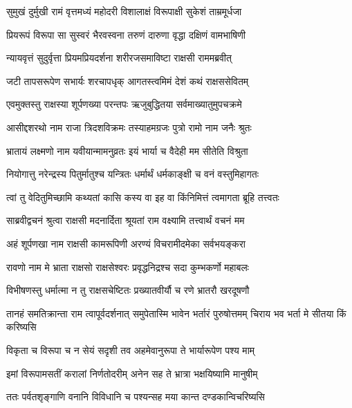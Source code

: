\twolineshloka
{सुमुखं दुर्मुखी रामं वृत्तमध्यं महोदरी}
{विशालाक्षं विरूपाक्षी सुकेशं ताम्रमूर्धजा} %

\twolineshloka
{प्रियरूपं विरूपा सा सुस्वरं भैरवस्वना}
{तरुणं दारुणा वृद्धा दक्षिणं वामभाषिणी} %

\twolineshloka
{न्यायवृत्तं सुदुर्वृत्ता प्रियमप्रियदर्शना}
{शरीरजसमाविष्टा राक्षसी राममब्रवीत्} %

\twolineshloka
{जटी तापसरूपेण सभार्यः शरचापधृक्}
{आगतस्त्वमिमं देशं कथं राक्षससेवितम्} %

\twolineshloka
{एवमुक्तस्तु राक्षस्या शूर्पणख्या परन्तपः}
{ऋजुबुद्धितया सर्वमाख्यातुमुपचक्रमे} %

\twolineshloka
{आसीद्दशरथो नाम राजा त्रिदशविक्रमः}
{तस्याहमग्रजः पुत्रो रामो नाम जनैः श्रुतः} %

\twolineshloka
{भ्रातायं लक्ष्मणो नाम यवीयान्मामनुव्रतः}
{इयं भार्या च वैदेही मम सीतेति विश्रुता} %

\twolineshloka
{नियोगात्तु नरेन्द्रस्य पितुर्मातुश्च यन्त्रितः}
{धर्मार्थं धर्मकाङ्क्षी च वनं वस्तुमिहागतः} %

\twolineshloka
{त्वां तु वेदितुमिच्छामि कथ्यतां कासि कस्य वा}
{इह वा किंनिमित्तं त्वमागता ब्रूहि तत्त्वतः} %

\twolineshloka
{साब्रवीद्वचनं श्रुत्वा राक्षसी मदनार्दिता}
{श्रूयतां राम वक्ष्यामि तत्त्वार्थं वचनं मम} %

\twolineshloka
{अहं शूर्पणखा नाम राक्षसी कामरूपिणी}
{अरण्यं विचरामीदमेका सर्वभयङ्करा} %

\twolineshloka
{रावणो नाम मे भ्राता राक्षसो राक्षसेश्वरः}
{प्रवृद्धनिद्रश्च सदा कुम्भकर्णो महाबलः} %

\twolineshloka
{विभीषणस्तु धर्मात्मा न तु राक्षसचेष्टितः}
{प्रख्यातवीर्यौ च रणे भ्रातरौ खरदूषणौ} %

\threelineshloka
{तानहं समतिक्रान्ता राम त्वापूर्वदर्शनात्}
{समुपेतास्मि भावेन भर्तारं पुरुषोत्तमम्}
{चिराय भव भर्ता मे सीतया किं करिष्यसि} %

\twolineshloka
{विकृता च विरूपा च न सेयं सदृशी तव}
{अहमेवानुरूपा ते भार्यारूपेण पश्य माम्} %

\twolineshloka
{इमां विरूपामसतीं करालां निर्णतोदरीम्}
{अनेन सह ते भ्रात्रा भक्षयिष्यामि मानुषीम्} %

\twolineshloka
{ततः पर्वतशृङ्गाणि वनानि विविधानि च}
{पश्यन्सह मया कान्त दण्डकान्विचरिष्यसि} %

